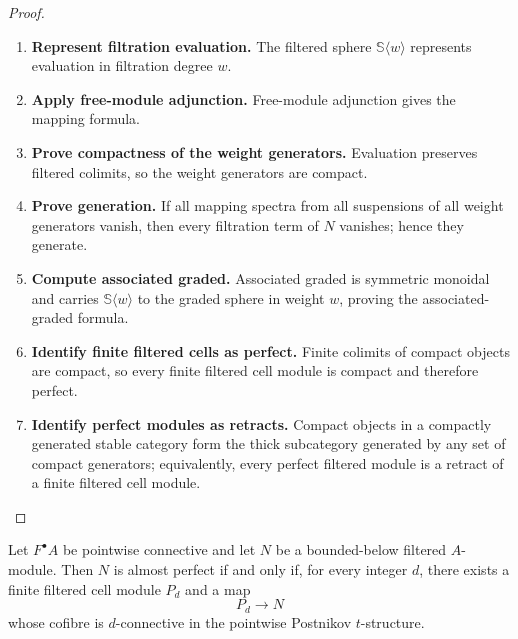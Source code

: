 \begin{proof}
\leavevmode
\begin{enumerate}[label=\textup{(\arabic*)}]
    \item \textbf{Represent filtration evaluation.}
    The filtered sphere \(\mathbb S\langle w\rangle\) represents evaluation in
    filtration degree \(w\).
    \item \textbf{Apply free-module adjunction.}
    Free-module adjunction gives the mapping formula.
    \item \textbf{Prove compactness of the weight generators.}
    Evaluation preserves filtered colimits, so the weight generators are compact.
    \item \textbf{Prove generation.}
    If all mapping spectra from all suspensions of all weight generators vanish,
    then every filtration term of \(N\) vanishes; hence they generate.
    \item \textbf{Compute associated graded.}
    Associated
    graded is symmetric monoidal and carries \(\mathbb S\langle w\rangle\) to
    the graded sphere in weight \(w\), proving the associated-graded formula.
    \item \textbf{Identify finite filtered cells as perfect.}
    Finite colimits of compact objects are compact, so every finite filtered
    cell module is compact and therefore perfect.
    \item \textbf{Identify perfect modules as retracts.}
    Compact objects in a compactly
    generated stable category form the thick subcategory generated by any set of
    compact generators; equivalently, every perfect filtered module is a retract
    of a finite filtered cell module.
\end{enumerate}
\end{proof}

\begin{lemma}
\label{lem:filtered-aperf-cell-criterion}
Let \(F^\bullet A\) be pointwise connective and let \(N\) be a bounded-below
filtered \(A\)-module. Then \(N\) is almost perfect if and only if, for every
integer \(d\), there exists a finite filtered cell module \(P_d\) and a map
\[
    P_d\longrightarrow N
\]
whose cofibre is \(d\)-connective in the pointwise Postnikov \(t\)-structure.
\end{lemma}

